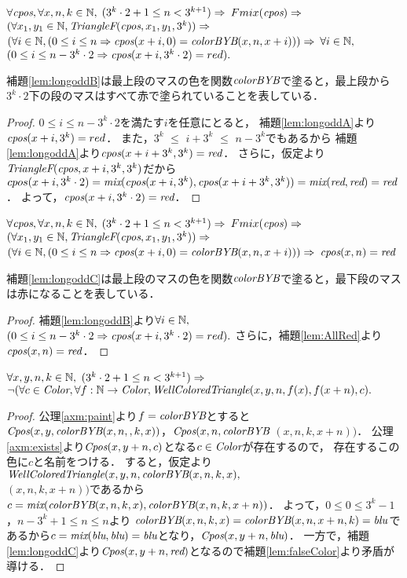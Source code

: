 \begin{lem}[\LongOddB] \label{lem:longoddB}
  $\forall \textit{cpos}, \forall x, n, k \in \mathbb{N},$
  $(3^k \cdot 2 + 1 \leq n < 3^{k+1}) \Rightarrow$
  $Fmix(\textit{cpos}) \Rightarrow $
  $(\forall x_1, y_1 \in \mathbb{N}, \textit{TriangleF}(\textit{cpos},x_1,y_1,3^k)) \Rightarrow$
  $(\forall i \in \mathbb{N}, (0 \leq i \leq n \Rightarrow \textit{cpos}(x+i,0) = \textit{colorBYB}(x,n,x+i))) \Rightarrow$
  $\forall i \in \mathbb{N},$ $(0 \leq i \leq n - 3^k \cdot 2 \Rightarrow \textit{cpos}(x+i,3^k \cdot 2) = red).$
\end{lem}
補題\ref{lem:longoddB}は最上段のマスの色を関数$\textit{colorBYB}$で塗ると，最上段から$3^k\cdot2$下の段のマスはすべて赤で塗られていることを表している．
\begin{proof}
  $0 \leq i \leq n - 3^k \cdot 2$を満たす$i$を任意にとると，
  補題\ref{lem:longoddA}より$\textit{cpos}(x+i,3^k) = red$．
  また，$3^k$ $\leq$ $i+3^k$ $\leq$ $n - 3^k$でもあるから
  補題\ref{lem:longoddA}より$\textit{cpos}(x+i+3^k,3^k) =\textit{red}$．
  さらに，仮定より$\textit{TriangleF}(\textit{cpos},x+i,3^k,3^k)$だから
  $cpos(x+i,3^k \cdot 2)=\textit{mix}(\textit{cpos}(x+i,3^k),\textit{cpos}(x+i+3^k,3^k))=\textit{mix}(\textit{red},\textit{red})=\textit{red}$．
  よって，$\textit{cpos}(x+i,3^k \cdot 2)=\textit{red}$．
\end{proof}

\begin{lem}[\LongOddC] \label{lem:longoddC}
  $\forall \textit{cpos}, \forall x, n, k \in \mathbb{N},$
  $(3^k \cdot 2 + 1 \leq n < 3^{k+1}) \Rightarrow$
  $Fmix(\textit{cpos}) \Rightarrow $
  $(\forall x_1, y_1 \in \mathbb{N}, \textit{TriangleF}(\textit{cpos},x_1,y_1,3^k)) \Rightarrow$
  $(\forall i \in \mathbb{N}, (0 \leq i \leq n \Rightarrow \textit{cpos}(x+i,0) = \textit{colorBYB}(x,n,x+i))) \Rightarrow$
  $\textit{cpos}(x,n) = \textit{red}$
\end{lem}
補題\ref{lem:longoddC}は最上段のマスの色を関数$\textit{colorBYB}$で塗ると，最下段のマスは赤になることを表している．
\begin{proof}
  補題\ref{lem:longoddB}より$\forall i \in \mathbb{N},$ $(0 \leq i \leq n - 3^k \cdot 2 \Rightarrow \textit{cpos}(x+i,3^k \cdot 2) = red).$
  さらに，補題\ref{lem:AllRed}より$\textit{cpos}(x,n)=\textit{red}$．
\end{proof}
\begin{lem}[\LongOdd] \label{lem:longodd}
  $\forall x,y,n,k \in \mathbb{N},$
  $(3^k\cdot2 + 1 \leq n < 3^{k+1}) \Rightarrow$
  $\lnot(\forall c \in \textit{Color}, \forall f:\mathbb{N} \to \textit{Color}, \textit{WellColoredTriangle}(x,y,n,f(x),f(x+n), c).$
\end{lem}
\begin{proof}
  公理\ref{axm:paint}より$f=\textit{colorBYB}$とすると
  $\textit{Cpos}(x,y,\textit{colorBYB}(x,n,,k,x))$，$\textit{Cpos}(x,n,\textit{colorBYB}$ $(x,n,k,x+n))$．
  公理\ref{axm:exists}より$\textit{Cpos}(x,y+n,c)$となる$c\in\textit{Color}$が存在するので，
  存在するこの色に$c$と名前をつける．
  すると，仮定より$\textit{WellColoredTriangle}(x,y,n,\textit{colorBYB}(x,n,k,x),$ \\
  $(x,n,k,x+n))$であるから$c=\textit{mix}(\textit{colorBYB}(x,n,k,x),\textit{colorBYB}(x,n,k,x+n))$．
  よって，$0 \leq 0 \leq 3^k-1$，$n-3^k+1 \leq n \leq n$より
  $\textit{colorBYB}(x,n,k,x)=\textit{colorBYB}(x,n,x+n,k)=\textit{blu}$であるから$c=\textit{mix}(\textit{blu},\textit{blu})=\textit{blu}$となり，$\textit{Cpos}(x,y+n,\textit{blu})$．
  一方で，補題\ref{lem:longoddC}より$\textit{Cpos}(x,y+n,\textit{red})$となるので補題\ref{lem:falseColor}より矛盾が導ける．
\end{proof}

